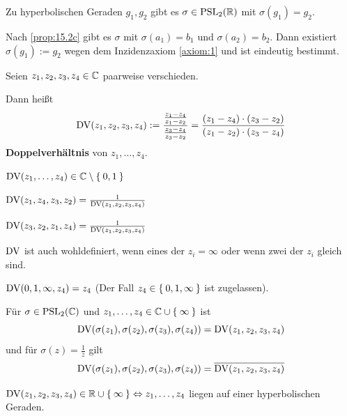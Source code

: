 \begin{bemerkung}%
    Zu hyperbolischen Geraden $g_1, g_2$ gibt es $\sigma \in \mathrm{PSL}_2(\mathbb{R})$
    mit $\sigma(g_1) = g_2$.
\end{bemerkung}
\begin{beweis}
    Nach \cref{prop:15.2c} gibt es $\sigma$ mit $\sigma(a_1) = b_1$
    und $\sigma(a_2) = b_2$. Dann existiert $\sigma(g_1) := g_2$
    wegen dem Inzidenzaxiom \ref{axiom:1} und ist eindeutig bestimmt.
\end{beweis}

\begin{definition}%
    Seien $z_1, z_2, z_3, z_4 \in \mathbb{C}$ paarweise verschieden.

    Dann heißt
    \[\operatorname{DV}(z_1, z_2, z_3, z_4) := \frac{\frac{z_1 - z_4}{z_1 - z_2}}{\frac{z_3 - z_4}{z_3 - z_2}} = \frac{(z_1 - z_4) \cdot (z_3 - z_2)}{(z_1 - z_2) \cdot (z_3 - z_4)}\]
    \textbf{Doppelverhältnis} von
    $z_1, \dots, z_4$.
\end{definition}

\begin{bemerkung}
    \begin{bemenum}
        \item $\operatorname{DV}(z_1, \dots, z_4) \in \mathbb{C} \setminus \Set{0,1}$
        \item \label{bem:15.4b.ii} $\operatorname{DV}(z_1, z_4, z_3, z_2) = \frac{1}{\operatorname{DV}(z_1, z_2, z_3, z_4)}$
        \item \label{bem:69.c} $\operatorname{DV}(z_3, z_2, z_1, z_4) = \frac{1}{\operatorname{DV}(z_1, z_2, z_3, z_4)}$
        \item $\operatorname{DV}$ ist auch wohldefiniert, wenn eines der $z_i = \infty$
              oder wenn zwei der $z_i$ gleich sind.
        \item $\operatorname{DV}(0, 1, \infty, z_4) = z_4$ (Der Fall $z_4 \in \Set{0, 1, \infty}$ ist zugelassen).
        \item \label{bem:15.4d} Für $\sigma \in \mathrm{PSL}_2(\mathbb{C})$ und $z_1, \dots, z_4 \in \mathbb{C} \cup \Set{\infty}$
              ist
              \[\operatorname{DV}(\sigma(z_1), \sigma(z_2), \sigma(z_3), \sigma(z_4)) = \operatorname{DV}(z_1, z_2, z_3, z_4)\]
              und für $\sigma(z) = \frac{1}{\overline{z}}$ gilt
              \[\operatorname{DV}(\sigma(z_1), \sigma(z_2), \sigma(z_3), \sigma(z_4)) = \overline{\operatorname{DV}(z_1, z_2, z_3, z_4)}\]
        \item \label{bem:15.4e} $\operatorname{DV}(z_1, z_2, z_3, z_4) \in \mathbb{R} \cup \Set{\infty} \Leftrightarrow z_1, \dots, z_4$
              liegen auf einer hyperbolischen Geraden.
    \end{bemenum}
\end{bemerkung}

